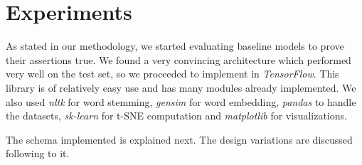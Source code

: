 \documentclass[a4paper,11pt]{article}
\begin{document}
\section{Experiments}


As stated in our methodology, we started evaluating baseline models to prove their assertions true. We found a very convincing architecture which performed very well on the test set, so we proceeded to implement in \textit{TensorFlow}. This library is of relatively easy use and has many modules already implemented. We also used \textit{nltk} for word stemming, \textit{gensim} for word embedding, \textit{pandas} to handle the datasets, \textit{sk-learn} for t-SNE computation and \textit{matplotlib} for visualizations.

The schema implemented is explained next. The design variations are discussed following to it.
\end{document}
